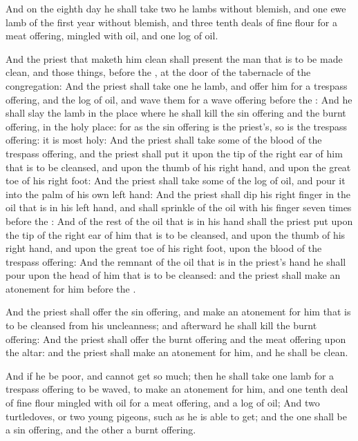 \verse And on the eighth day he shall take two he lambs without blemish, and one ewe lamb of the first year without blemish, and three tenth deals of fine flour for a meat offering, mingled with oil, and one log of oil.

\verse And the priest that maketh him clean shall present the man that is to be made clean, and those things, before the \LORD, at the door of the tabernacle of the congregation: \verse And the priest shall take one he lamb, and offer him for a trespass offering, and the log of oil, and wave them for a wave offering before the \LORD: \verse And he shall slay the lamb in the place where he shall kill the sin offering and the burnt offering, in the holy place: for as the sin offering is the priest's, so is the trespass offering: it is most holy: \verse And the priest shall take some of the blood of the trespass offering, and the priest shall put it upon the tip of the right ear of him that is to be cleansed, and upon the thumb of his right hand, and upon the great toe of his right foot: \verse And the priest shall take some of the log of oil, and pour it into the palm of his own left hand: \verse And the priest shall dip his right finger in the oil that is in his left hand, and shall sprinkle of the oil with his finger seven times before the \LORD: \verse And of the rest of the oil that is in his hand shall the priest put upon the tip of the right ear of him that is to be cleansed, and upon the thumb of his right hand, and upon the great toe of his right foot, upon the blood of the trespass offering: \verse And the remnant of the oil that is in the priest's hand he shall pour upon the head of him that is to be cleansed: and the priest shall make an atonement for him before the \LORD.

\verse And the priest shall offer the sin offering, and make an atonement for him that is to be cleansed from his uncleanness; and afterward he shall kill the burnt offering: \verse And the priest shall offer the burnt offering and the meat offering upon the altar: and the priest shall make an atonement for him, and he shall be clean.

\verse And if he be poor, and cannot get so much; then he shall take one lamb for a trespass offering to be waved, to make an atonement for him, and one tenth deal of fine flour mingled with oil for a meat offering, and a log of oil; \verse And two turtledoves, or two young pigeons, such as he is able to get; and the one shall be a sin offering, and the other a burnt offering.

